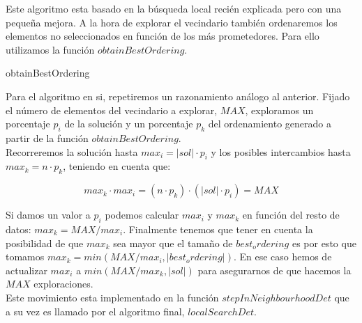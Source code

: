 \documentclass[11pt,a4paper]{article}
\begin{document}
	Este algoritmo esta basado en la búsqueda local recién explicada pero con una pequeña mejora. A la hora de explorar el vecindario también ordenaremos los elementos no seleccionados en función de los más prometedores. Para ello utilizamos la función $obtainBestOrdering$. \\
	
	\begin{algorithm}[H]
		\caption{obtainBestOrdering}
	\end{algorithm}
	
	Para el algoritmo en si, repetiremos un razonamiento análogo al anterior. Fijado el número de elementos del vecindario a explorar, $MAX$, exploramos un porcentaje $p_i$ de la solución y un porcentaje $p_k$ del ordenamiento generado a partir de la función $obtainBestOrdering$. \\
	
	Recorreremos la solución hasta $max_i = |sol| \cdot p_i$ y los posibles intercambios hasta $max_k = n \cdot p_k$, teniendo en cuenta que:
	
	$$ max_k \cdot max_i = (n \cdot p_k) \cdot (|sol| \cdot p_i) = MAX$$ 
	
	Si damos un valor a $p_i$ podemos calcular $max_i$ y $max_k$ en función del resto de datos: $ max_k = MAX / max_i $. Finalmente tenemos que tener en cuenta la posibilidad de que $max_k$ sea mayor que el tamaño de $best_ordering$ es por esto que tomamos $max_k = min(MAX / max_i , |best_ordering|)$. En ese caso hemos de actualizar $max_i$ a $min(MAX / max_k, |sol|)$ para asegurarnos de que hacemos la $MAX$ exploraciones. \\ 
	
	Este movimiento esta implementado en la función $stepInNeighbourhoodDet$ que a su vez es llamado por el algoritmo final, $localSearchDet$. \\
	
\end{document}
